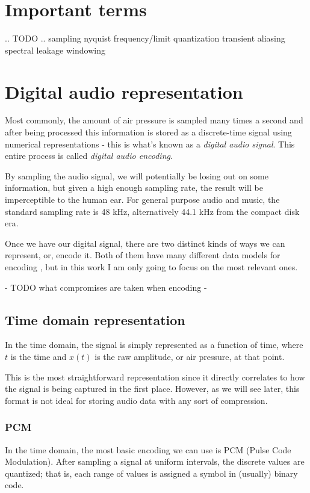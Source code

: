 \section{Important terms}
.. TODO ..
sampling
nyquist frequency/limit
quantization
transient
aliasing
spectral leakage
windowing

\section{Digital audio representation}
Most commonly, the amount of air pressure is sampled many times a second and after being processed this information is stored as a discrete-time signal using numerical representations - this is what's known as a \emph{digital audio signal}. This entire process is called \emph{digital audio encoding}.

By sampling the audio signal, we will potentially be losing out on some information, but given a high enough sampling rate, the result will be imperceptible to the human ear. For general purpose audio and music, the standard sampling rate is 48 kHz, alternatively 44.1 kHz from the compact disk era.

Once we have our digital signal, there are two distinct kinds of ways we can represent, or, encode it. Both of them have many different data models for encoding \cite{you_2010}, but in this work I am only going to focus on the most relevant ones.

- TODO what compromises are taken when encoding -

\subsection{Time domain representation}
In the time domain, the signal is simply represented as a function of time, where $t$ is the time and $x(t)$ is the raw amplitude, or air pressure, at that point. \cite{bosi_goldberg_2003}

This is the most straightforward representation since it directly correlates to how the signal is being captured in the first place. However, as we will see later, this format is not ideal for storing audio data with any sort of compression.

\subsubsection{PCM}
In the time domain, the most basic encoding we can use is PCM (Pulse Code Modulation). After sampling a signal at uniform intervals, the discrete values are quantized; that is, each range of values is assigned a symbol in (usually) binary code.

